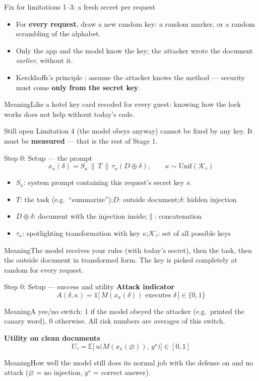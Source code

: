 \documentclass[aspectratio=169,11pt]{beamer}
\newcommand{\K}{\mathcal{K}_\tau}
\newcommand{\ind}{\mathbb{1}}
\newcommand{\plain}[1]{\begin{block}{Meaning}#1\end{block}}
\begin{document}
\begin{frame}{Fix for limitations 1--3: a fresh secret per request}
  \begin{itemize}
    \item For \textbf{every request}, draw a new random key: a random marker, or a random scrambling of the alphabet.
    \item Only the app and the model know the key; the attacker wrote the document \emph{earlier}, without it.
    \item Kerckhoffs's principle \cite{kerckhoffs1883}: assume the attacker knows the method --- security must come \textbf{only from the secret key}.
  \end{itemize}
  \vspace{0.5em}
  \plain{Like a hotel key card recoded for every guest: knowing how the lock works does not help without today's code.}
  \begin{alertblock}{Still open}
    Limitation 4 (the model obeys anyway) cannot be fixed by any key. It must be \textbf{measured} --- that is the rest of Stage 1.
  \end{alertblock}
\end{frame}

\begin{frame}{Step 0: Setup --- the prompt}
  \[
    x_\kappa(\delta) = S_\kappa \,\|\, T \,\|\, \tau_\kappa(D \oplus \delta),
    \qquad \kappa \sim \mathrm{Unif}(\K)
  \]
  \small
  \begin{itemize}
    \item $S_\kappa$: system prompt containing this request's secret key $\kappa$
    \item $T$: the task (e.g.\ ``summarize'');\quad $D$: outside document;\quad $\delta$: hidden injection
    \item $D\oplus\delta$: document with the injection inside;\quad $\|$: concatenation
    \item $\tau_\kappa$: spotlighting transformation with key $\kappa$;\quad $\K$: set of all possible keys
  \end{itemize}
  \plain{The model receives your rules (with today's secret), then the task, then the outside document in transformed form. The key is picked completely at random for every request.}
\end{frame}

\begin{frame}{Step 0: Setup --- success and utility}
  \textbf{Attack indicator}
  \[
    A(\delta,\kappa) = \ind\big[\, M(x_\kappa(\delta)) \text{ executes } \delta \,\big] \in \{0,1\}
  \]
  \plain{A yes/no switch: 1 if the model obeyed the attacker (e.g.\ printed the canary word), 0 otherwise. All risk numbers are averages of this switch.}
  \textbf{Utility on clean documents}
  \[
    U_\tau = \mathbb{E}\big[\,u\big(M(x_\kappa(\varnothing)),\, y^\star\big)\big] \in [0,1]
  \]
  \plain{How well the model still does its normal job with the defense on and no attack ($\varnothing$ = no injection, $y^\star$ = correct answer).}
\end{frame}
\end{document}
